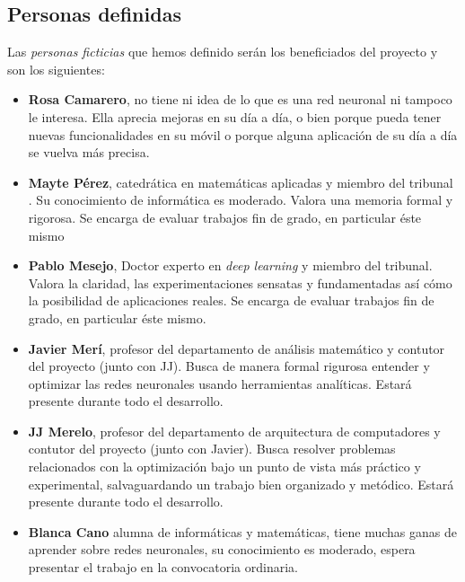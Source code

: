 \subsection{Personas definidas}  \label{ch:metodología_personas}

Las \textit{personas ficticias} que hemos definido serán los beneficiados del proyecto 
y son los siguientes:  

\begin{itemize}

    \item \textbf{Rosa Camarero}, no tiene ni idea de lo que es una red neuronal ni tampoco le interesa.  Ella aprecia mejoras en su día a día, o bien porque pueda tener nuevas funcionalidades en su móvil o porque alguna 
    aplicación de su día a día se vuelva más precisa. 

    \item \textbf{Mayte Pérez}, catedrática en matemáticas aplicadas y miembro del tribunal . Su conocimiento
    de informática es moderado. Valora una memoria formal y rigorosa. Se encarga de evaluar trabajos fin de grado, en particular éste mismo
    
    \item \textbf{Pablo Mesejo}, Doctor experto en \textit{deep learning} y miembro del tribunal. Valora la claridad, las experimentaciones sensatas y fundamentadas así cómo la posibilidad de aplicaciones reales. Se encarga de evaluar trabajos fin de grado, en particular éste mismo. 
    
    \item \textbf{Javier Merí}, profesor del departamento de análisis matemático y contutor del proyecto (junto con JJ). Busca de manera formal rigurosa entender y optimizar las redes neuronales usando herramientas analíticas. Estará presente durante todo el desarrollo. 
    
    \item   \textbf{JJ Merelo}, profesor del departamento de arquitectura de computadores y contutor del proyecto (junto con Javier). 
    Busca resolver problemas relacionados con la optimización bajo un punto de vista más práctico y experimental, salvaguardando un trabajo bien organizado y metódico. Estará presente durante todo el desarrollo. 

    \item \textbf{Blanca Cano} alumna de informáticas y matemáticas, tiene muchas ganas de aprender sobre redes 
    neuronales, su conocimiento es moderado, espera presentar el trabajo en la convocatoria ordinaria. 

\end{itemize}

